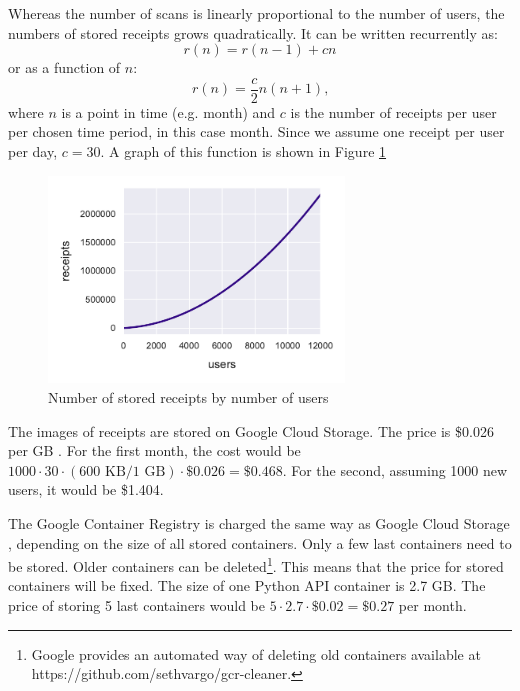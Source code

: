 \documentclass[
  digital, %
  table,   %
  oneside, %
  lof,     %
  lot,     %
]{fithesis3}
\begin{document}
Whereas the number of scans is linearly proportional to the number of users, the numbers of stored receipts grows quadratically. It can be written recurrently as: 
\begin{equation}
r(n) = r(n-1) + cn
\end{equation}
or as a function of $n$:
\begin{equation}
r(n) = \frac{c}{2}n(n + 1)\text{,}
\end{equation}
where $n$ is a point in time (e.g. month) and $c$ is the number of receipts per user per chosen time period, in this case month. Since we assume one receipt per user per day, $c = 30$. A graph of this function is shown in Figure \ref{fig:receipts_by_users}

\begin{figure}
    \begin{center}
        \includegraphics[width=0.7\textwidth]{figures/graphs/receipts_by_users}
    \end{center}
    \caption{Number of stored receipts by number of users}
    \label{fig:receipts_by_users}
\end{figure}

The images of receipts are stored on Google Cloud Storage. The price is \$0.026 per GB \cite{CloudStoragePricing}. For the first month, the cost would be $\num{1000}\cdot30\cdot(600\text{ KB} / 1\text{ GB})\cdot\$0.026 = \$0.468$.
For the second, assuming \num{1000} new users, it would be \$1.404.

The Google Container Registry is charged the same way as Google Cloud Storage \cite{ContainerRegistryPricing}, depending on the size of all stored containers. Only a few last containers need to be stored. Older containers can be deleted\footnote{Google provides an automated way of deleting old containers available at https://github.com/sethvargo/gcr-cleaner.}. This means that the price for stored containers will be fixed. The size of one Python API container is 2.7 GB. The price of storing 5 last containers would be $5\cdot2.7\cdot\$0.02 = \$0.27$ per month. 
\end{document}
